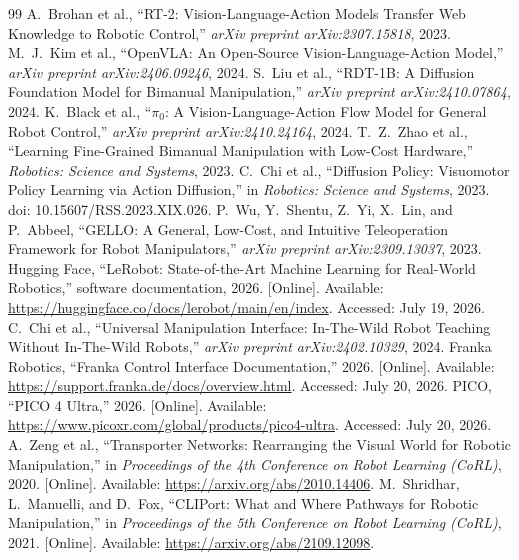 \documentclass[12pt, letterpaper]{article}
\begin{document}
\newpage
{}
\begin{thebibliography}{99}
 A.~Brohan et al., ``RT-2: Vision-Language-Action Models Transfer Web Knowledge to Robotic Control,'' \textit{arXiv preprint arXiv:2307.15818}, 2023.
 M.~J.~Kim et al., ``OpenVLA: An Open-Source Vision-Language-Action Model,'' \textit{arXiv preprint arXiv:2406.09246}, 2024.
 S.~Liu et al., ``RDT-1B: A Diffusion Foundation Model for Bimanual Manipulation,'' \textit{arXiv preprint arXiv:2410.07864}, 2024.
 K.~Black et al., ``$\pi_0$: A Vision-Language-Action Flow Model for General Robot Control,'' \textit{arXiv preprint arXiv:2410.24164}, 2024.
 T.~Z.~Zhao et al., ``Learning Fine-Grained Bimanual Manipulation with Low-Cost Hardware,'' \textit{Robotics: Science and Systems}, 2023.
 C.~Chi et al., ``Diffusion Policy: Visuomotor Policy Learning via Action Diffusion,'' in \textit{Robotics: Science and Systems}, 2023. doi: 10.15607/RSS.2023.XIX.026.
 P.~Wu, Y.~Shentu, Z.~Yi, X.~Lin, and P.~Abbeel, ``GELLO: A General, Low-Cost, and Intuitive Teleoperation Framework for Robot Manipulators,'' \textit{arXiv preprint arXiv:2309.13037}, 2023.
 Hugging Face, ``LeRobot: State-of-the-Art Machine Learning for Real-World Robotics,'' software documentation, 2026. [Online]. Available: \url{https://huggingface.co/docs/lerobot/main/en/index}. Accessed: July 19, 2026.
 C.~Chi et al., ``Universal Manipulation Interface: In-The-Wild Robot Teaching Without In-The-Wild Robots,'' \textit{arXiv preprint arXiv:2402.10329}, 2024.
 Franka Robotics, ``Franka Control Interface Documentation,'' 2026. [Online]. Available: \url{https://support.franka.de/docs/overview.html}. Accessed: July 20, 2026.
 PICO, ``PICO 4 Ultra,'' 2026. [Online]. Available: \url{https://www.picoxr.com/global/products/pico4-ultra}. Accessed: July 20, 2026.
 A.~Zeng et al., ``Transporter Networks: Rearranging the Visual World for Robotic Manipulation,'' in \textit{Proceedings of the 4th Conference on Robot Learning (CoRL)}, 2020. [Online]. Available: \url{https://arxiv.org/abs/2010.14406}.
 M.~Shridhar, L.~Manuelli, and D.~Fox, ``CLIPort: What and Where Pathways for Robotic Manipulation,'' in \textit{Proceedings of the 5th Conference on Robot Learning (CoRL)}, 2021. [Online]. Available: \url{https://arxiv.org/abs/2109.12098}.

\end{thebibliography}
\end{document}

